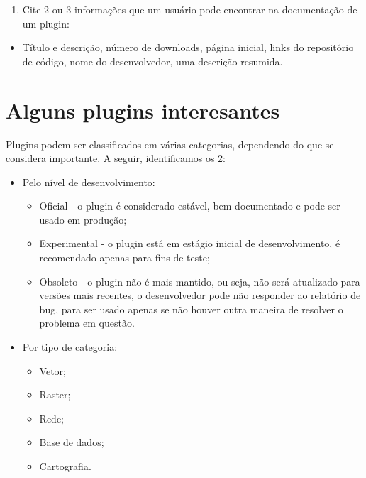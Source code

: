 \documentclass[
  portuguese,
]{krantz}
\providecommand{\tightlist}{%
  \setlength{\itemsep}{0pt}\setlength{\parskip}{0pt}}
\begin{document}
\begin{enumerate}
\def\labelenumi{\arabic{enumi}.}
\setcounter{enumi}{2}
\tightlist
\item
  Cite 2 ou 3 informações que um usuário pode encontrar na documentação de um plugin:
\end{enumerate}

\begin{itemize}
\tightlist
\item
  Título e descrição, número de downloads, página inicial, links do repositório de código, nome do desenvolvedor, uma descrição resumida.
\end{itemize}

\hypertarget{alguns-plugins-interesantes}{%
\section{Alguns plugins interesantes}\label{alguns-plugins-interesantes}}

Plugins podem ser classificados em várias categorias, dependendo do que se considera importante. A seguir, identificamos os 2:

\begin{itemize}
\tightlist
\item
  Pelo nível de desenvolvimento:

  \begin{itemize}
  \tightlist
  \item
    Oficial - o plugin é considerado estável, bem documentado e pode ser usado em produção;
  \item
    Experimental - o plugin está em estágio inicial de desenvolvimento, é recomendado apenas para fins de teste;
  \item
    Obsoleto - o plugin não é mais mantido, ou seja, não será atualizado para versões mais recentes, o desenvolvedor pode não responder ao relatório de bug, para ser usado apenas se não houver outra maneira de resolver o problema em questão.
  \end{itemize}
\item
  Por tipo de categoria:

  \begin{itemize}
  \tightlist
  \item
    Vetor;
  \item
    Raster;
  \item
    Rede;
  \item
    Base de dados;
  \item
    Cartografia.
  \end{itemize}
\end{itemize}
\end{document}
